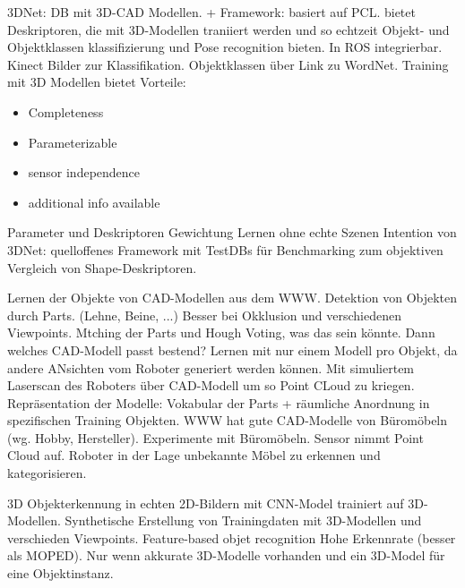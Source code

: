 \cite{3dnet} \newline
3DNet: DB mit 3D-CAD Modellen. + Framework: basiert auf PCL. bietet Deskriptoren, die mit 3D-Modellen traniiert werden und so echtzeit Objekt- und Objektklassen klassifizierung und Pose recognition bieten. In ROS integrierbar. Kinect Bilder zur Klassifikation. \newline
Objektklassen über Link zu WordNet. \newline 
Training mit 3D Modellen bietet Vorteile: 
\begin{itemize}
	\item Completeness
	\item Parameterizable
	\item sensor independence
	\item additional info available
\end{itemize}
Parameter und Deskriptoren Gewichtung Lernen ohne echte Szenen \newline
Intention von 3DNet: quelloffenes Framework mit TestDBs für Benchmarking zum objektiven Vergleich von Shape-Deskriptoren. \par


\citep{modelsWWW}
Lernen der Objekte von CAD-Modellen aus dem WWW. \newline
Detektion von Objekten durch Parts. (Lehne, Beine, ...) Besser bei Okklusion und verschiedenen Viewpoints. Mtching der Parts und Hough Voting, was das sein könnte. Dann welches CAD-Modell passt bestend? \newline
Lernen mit nur einem Modell pro Objekt, da andere ANsichten vom Roboter generiert werden können. Mit simuliertem Laserscan des Roboters über CAD-Modell um so Point CLoud zu kriegen.\newline
Repräsentation der Modelle: Vokabular der Parts + räumliche Anordnung in spezifischen Training Objekten. \newline
WWW hat gute CAD-Modelle von Büromöbeln (wg. Hobby, Hersteller). Experimente mit Büromöbeln. Sensor nimmt Point Cloud auf. \newline
Roboter in der Lage unbekannte Möbel zu erkennen und kategorisieren. \par


\cite{3DCNNObjRec} \newline
3D Objekterkennung in echten 2D-Bildern mit CNN-Model trainiert auf 3D-Modellen. \newline
Synthetische Erstellung von Trainingdaten mit 3D-Modellen und verschieden Viewpoints. \newline
Feature-based objet recognition \newline
Hohe Erkennrate (besser als MOPED). Nur wenn akkurate 3D-Modelle vorhanden und ein 3D-Model für eine Objektinstanz.



